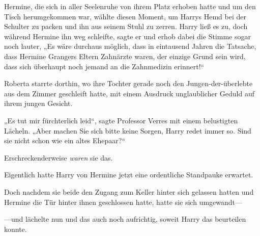 Hermine, die sich in aller Seelenruhe von ihrem Platz erhoben hatte und um den Tisch herumgekommen war, wählte diesen Moment, um Harrys Hemd bei der Schulter zu packen und ihn aus seinem Stuhl zu zerren. Harry ließ es zu, doch während Hermine ihn weg schleifte, sagte er und erhob dabei die Stimme sogar noch lauter,
„Es wäre durchaus möglich, dass in eintausend Jahren die Tatsache, dass Hermine Grangers Eltern Zahnärzte waren, der einzige Grund sein wird, dass sich überhaupt noch jemand an die Zahnmedizin erinnert!“

\later

Roberta starrte dorthin, wo ihre Tochter gerade noch den Jungen-der-überlebte aus dem Zimmer geschleift hatte, mit einem Ausdruck unglaublicher Geduld auf ihrem jungen Gesicht.

„Es tut mir fürchterlich leid“, sagte Professor Verres mit einem belustigten Lächeln.
„Aber machen Sie sich bitte keine Sorgen, Harry redet immer so. Sind sie nicht schon wie ein altes Ehepaar?“

Erschreckenderweise \emph{waren} sie das.

\later

Eigentlich hatte Harry von Hermine jetzt eine ordentliche Standpauke erwartet.

Doch nachdem sie beide den Zugang zum Keller hinter sich gelassen hatten und Hermine die Tür hinter ihnen geschlossen hatte, hatte sie sich umgewandt—

—und lächelte nun und das auch noch aufrichtig, soweit Harry das beurteilen konnte.

